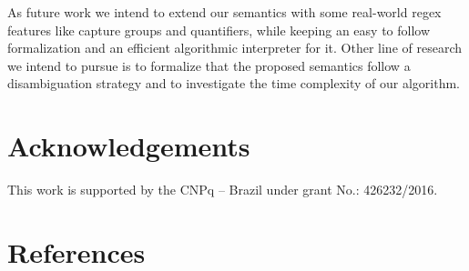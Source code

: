 \documentclass[review]{elsarticle}
\theoremstyle{definition}
\begin{document}
As future work we intend to extend our semantics with some real-world regex
features like capture groups and quantifiers, while keeping an easy to follow
formalization and an efficient algorithmic interpreter for it. Other line of
research we intend to pursue is to formalize that the proposed semantics follow 
a disambiguation strategy and to investigate the time complexity of our
algorithm.

\section*{Acknowledgements}

This work is supported by the CNPq – Brazil under grant No.: 426232/2016.

\section*{References}


\end{document}
